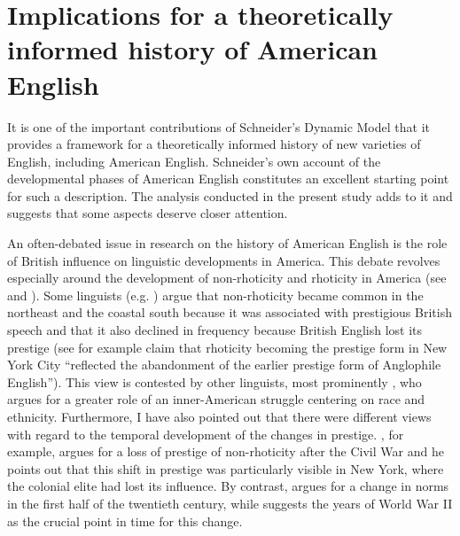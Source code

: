 \section{Implications for a theoretically informed history of American English}
\hypertarget{Toc63021254}{}
It is one of the important contributions of Schneider’s Dynamic Model that it provides a framework for a theoretically informed history of new varieties of English, including American English. Schneider’s own account of the developmental phases of American English constitutes an excellent starting point for such a description. The analysis conducted in the present study adds to it and suggests that some aspects deserve closer attention.


An often-debated issue in research on the history of American English is the role of British influence on linguistic developments in America. This debate revolves especially around the development of non-rhoticity and rhoticity in America (see  and ). Some linguists (e.g. \citealt{Fisher2001}) argue that non-rhoticity became common in the northeast and the coastal south because it was associated with prestigious British speech and that it also declined in frequency because British English lost its prestige (see for example  claim that rhoticity becoming the prestige form in New York City “reflected the abandonment of the earlier prestige form of Anglophile English”). This view is contested by other linguists, most prominently \citet{Bonfiglio2002}, who argues for a greater role of an inner-American struggle centering on race and ethnicity. Furthermore, I have also pointed out that there were different views with regard to the temporal development of the changes in prestige. \citet{Fisher2001}, for example, argues for a loss of prestige of non-rhoticity after the Civil War and he points out that this shift in prestige was particularly visible in New York, where the colonial elite had lost its influence. By contrast, \citet{Bonfiglio2002} argues for a change in norms in the first half of the twentieth century, while \citet{Labov2006} suggests the years of World War II as the crucial point in time for this change.

